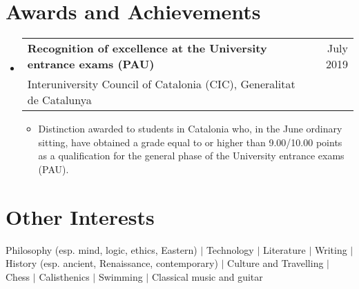 \documentclass[a4paper,10pt]{article}
\makeatletter
\newcommand{\resumeTrioHeading}[3]{
  \item
    \begin{tabular*}{0.96\textwidth}[t]{
      l@{\extracolsep{\fill}}c@{\extracolsep{\fill}}r
    }
      \textbf{#1} & \small \textit{#2} & \small #3
    \end{tabular*}
}
\newcommand{\resumeQuadHeading}[4]{
  \item
  \begin{tabular*}{0.96\textwidth}[t]{l@{\extracolsep{\fill}}r}
    \textbf{#1} & \small #2 \\
    \small#3 & \small #4 \\
  \end{tabular*}
}
\newcommand{\resumeHeadingListStart}{
  \begin{itemize}[leftmargin=0.15in, label={}]
}
\newcommand{\resumeHeadingListEnd}{\end{itemize}}
\makeatother
\begin{document}
  

\section{Awards and Achievements}
  \resumeHeadingListStart{}
    \resumeQuadHeading{Recognition of excellence at the University entrance exams (PAU)}{July 2019}{Interuniversity Council of Catalonia (CIC), Generalitat de Catalunya}{\ }
    \begin{itemize}[leftmargin=3em, itemsep=0.1em, topsep=2pt]
      \item \small Distinction awarded to students in Catalonia who, in the June ordinary sitting, have obtained a grade equal to or higher than 9.00/10.00 points as a qualification for the general phase of the University entrance exams (PAU).
    \end{itemize}
  \resumeHeadingListEnd{}

\section{Other Interests}
  Philosophy \small{(esp. mind, logic, ethics, Eastern)} \normalsize{\; $|$ \; Technology \; $|$ \; Literature \; $|$ \; Writing \; $|$ \; History} \small{(esp. ancient, Renaissance, contemporary)} \normalsize{\; $|$ \; Culture and Travelling \; $|$ \; Chess \; $|$ \; Calisthenics \; $|$ \; Swimming \; $|$ \; Classical music and guitar}
\end{document}

